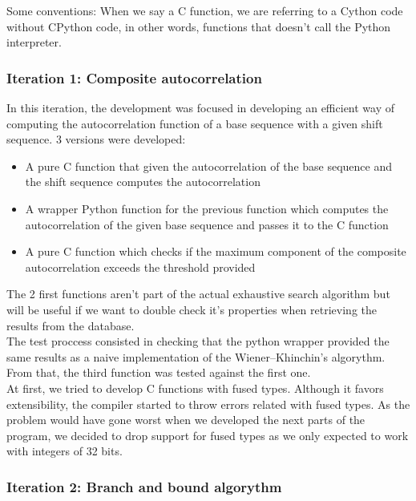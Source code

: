       Some conventions: When we say a C function, we are referring to a Cython
      code without CPython code, in other words, functions that doesn't call
      the Python interpreter.

      \subsubsection{Iteration 1: Composite autocorrelation}

      In this iteration, the development was focused in developing an efficient
      way of computing the autocorrelation function of a base sequence with a
      given shift sequence. 3 versions were developed:
      \begin{itemize}
        \item A pure C function that given the autocorrelation of the base
        sequence and the shift sequence computes the autocorrelation
        \item A wrapper Python function for the previous function which
        computes the autocorrelation of the given base sequence and passes it
        to the C function
        \item A pure C function which checks if the maximum component of the
        composite autocorrelation exceeds the threshold provided
      \end{itemize}

      The 2 first functions aren't part of the actual exhaustive search
      algorithm but will be useful if we want to double check it's properties
      when retrieving the results from the database. \\

      The test proccess consisted in checking that the python wrapper provided
      the same results as a naive implementation of the Wiener–Khinchin's
      algorythm. From that, the third function was tested against the first
      one.\\

      At first, we tried to develop C functions with fused types. Although it
      favors extensibility, the compiler started to throw errors related with
      fused types. As the problem would have gone worst when we developed the
      next parts of the program, we decided to drop support for fused types as
      we only expected to work with integers of 32 bits.\\

      \subsubsection{Iteration 2: Branch and bound algorythm}

